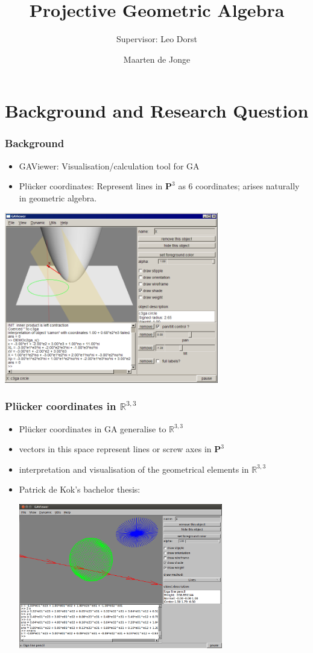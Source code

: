 \documentclass{beamer}
\author{Maarten de Jonge}
\title[PGA]{Projective Geometric Algebra}
\subtitle{Supervisor: Leo Dorst}
\newcommand{\rp}{$\mathbb{R}^{3,3}$}
\begin{document}
  \frame{\titlepage}

  \section{Background and Research Question}
  \begin{frame}
    \frametitle{Background}
    \begin{itemize}
      \item GAViewer: Visualisation/calculation tool for GA
      \item Pl\"{u}cker coordinates: Represent lines in $\mathbf{P}^3$ as 6
        coordinates; arises naturally in geometric algebra.
    \end{itemize}

    \begin{center}
      \includegraphics[width=0.7\textwidth]{gaviewer.png}
    \end{center}
  \end{frame}

  \begin{frame}
    \frametitle{Pl\"{u}cker coordinates in \rp}
    \begin{itemize}
      \item Pl\"{u}cker coordinates in GA generalise to \rp\cite{hangbo2011}
      \item vectors in this space represent lines or screw axes in $\mathbf{P}^3$
      \item interpretation and visualisation of the geometrical elements in \rp
      \item Patrick de Kok's bachelor thesis:
        \begin{center}
          \includegraphics[width=0.7\textwidth]{gaviewer2.png}
        \end{center}
    \end{itemize}
  \end{frame}
\end{document}
